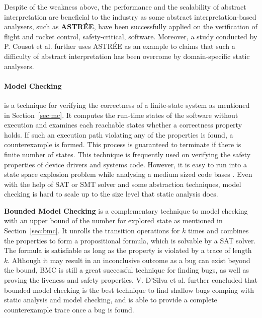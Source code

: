 Despite of the weakness above, the performance and the scalability of abstract interpretation are beneficial to the industry as some abstract interpretation-based analysers, such as \textbf{ASTR\'EE}, have been successfully applied on the verification of flight and rocket control, safety-critical, software. Moreover, a study conducted by P. Cousot et al. \cite{CousotEtAl10-FMSD} further uses ASTR\'EE as an example to claims that such a difficulty of abstract interpretation has been overcome by domain-specific static analysers. 




\paragraph{Model Checking} is a technique for verifying the correctness of a finite-state system as mentioned in Section~\ref{sec:mc}. It computes the run-time states of the software without execution and examines each reachable states whether a correctness property holds. If such an execution path violating any of the properties is found, a counterexample is formed. This process is guaranteed to terminate if there is finite number of states. This technique is frequently used on verifying the safety properties of device drivers and systems code. However, it is easy to run into a state space explosion problem while analysing a medium sized code bases \cite{Yeolekar2013}. Even with the help of SAT or SMT solver and some abstraction techniques, model checking is hard to scale up to the size level that static analysis does.

\textbf{Bounded Model Checking} is a complementary technique to model checking with an upper bound of the number for explored state as mentioned in Section~\ref{sec:bmc}. It unrolls the transition operations for $k$ times and combines the properties to form a propositional formula, which is solvable by a SAT solver. The formula is satisfiable as long as the property is violated by a trace of length $k$. Although it may result in an inconclusive outcome as a bug can exist beyond the bound, BMC is still a great successful technique for finding bugs, as well as proving the liveness and safety properties. V. D'Silva et al. \cite{4544862} further concluded that bounded model checking is the best technique to find shallow bugs comping with static analysis and model checking, and is able to provide a complete counterexample trace once a bug is found. 

